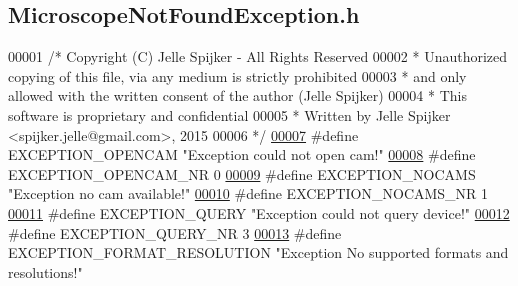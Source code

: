 \hypertarget{_microscope_not_found_exception_8h_source}{}\subsection{Microscope\+Not\+Found\+Exception.\+h}
\label{_microscope_not_found_exception_8h_source}

\begin{DoxyCode}
00001 \textcolor{comment}{/* Copyright (C) Jelle Spijker - All Rights Reserved}
00002 \textcolor{comment}{ * Unauthorized copying of this file, via any medium is strictly prohibited}
00003 \textcolor{comment}{ * and only allowed with the written consent of the author (Jelle Spijker)}
00004 \textcolor{comment}{ * This software is proprietary and confidential}
00005 \textcolor{comment}{ * Written by Jelle Spijker <spijker.jelle@gmail.com>, 2015}
00006 \textcolor{comment}{ */}
\hypertarget{_microscope_not_found_exception_8h_source_l00007}{}\hyperlink{_microscope_not_found_exception_8h_a69e1e16e9fdd8f6a1baa210cb5e10a31}{00007} \textcolor{preprocessor}{#define EXCEPTION\_OPENCAM "Exception could not open cam!"}
\hypertarget{_microscope_not_found_exception_8h_source_l00008}{}\hyperlink{_microscope_not_found_exception_8h_af8282326d2a9ad43efdb6ad3727b5afa}{00008} \textcolor{preprocessor}{#define EXCEPTION\_OPENCAM\_NR 0}
\hypertarget{_microscope_not_found_exception_8h_source_l00009}{}\hyperlink{_microscope_not_found_exception_8h_ab454d881077ad1b9fa1ff6a97af31e8a}{00009} \textcolor{preprocessor}{#define EXCEPTION\_NOCAMS "Exception no cam available!"}
\hypertarget{_microscope_not_found_exception_8h_source_l00010}{}\hyperlink{_microscope_not_found_exception_8h_aea497321765f9a7c7cafc933aff14866}{00010} \textcolor{preprocessor}{#define EXCEPTION\_NOCAMS\_NR 1}
\hypertarget{_microscope_not_found_exception_8h_source_l00011}{}\hyperlink{_microscope_not_found_exception_8h_aff89937633d667a17b2bff80551e4574}{00011} \textcolor{preprocessor}{#define EXCEPTION\_QUERY "Exception could not query device!"}
\hypertarget{_microscope_not_found_exception_8h_source_l00012}{}\hyperlink{_microscope_not_found_exception_8h_acb42acfdb2279208d47da5b3c3018f9d}{00012} \textcolor{preprocessor}{#define EXCEPTION\_QUERY\_NR 3}
\hypertarget{_microscope_not_found_exception_8h_source_l00013}{}\hyperlink{_microscope_not_found_exception_8h_ab650af121ed082c949c26dc889e914fd}{00013} \textcolor{preprocessor}{#define EXCEPTION\_FORMAT\_RESOLUTION "Exception No supported formats and resolutions!"}

\end{DoxyCode}
